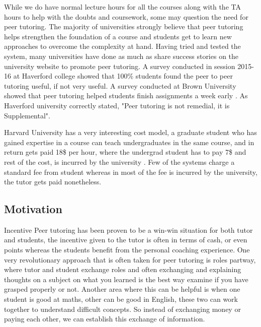\documentclass{sig-alternate-05-2015}
\begin{document}
While we do have normal lecture hours for all the courses along with the TA hours to help with the doubts and coursework, some may question the need for peer tutoring. The majority of universities strongly believe that peer tutoring helps strengthen the foundation of a course and students get to learn new approaches to overcome the complexity at hand. Having tried and tested the system, many universities have done as much as share success stories on the university website to promote peer tutoring. A survey conducted in session 2015-16 at Haverford college showed that 100\% students found the peer to peer tutoring useful, if not very useful. A survey conducted at Brown University showed that peer tutoring helped students finish assignments a week early \cite{Haverford}. As Haverford university correctly stated, "Peer tutoring is not remedial, it is Supplemental".

Harvard University has a very interesting cost model, a graduate student who has gained expertise in a course can teach undergraduates in the same course, and in return gets paid 18\$ per hour, where the undergrad student has to pay 7\$ and rest of the cost, is incurred by the university \cite{Harvard}. Few of the systems charge a standard fee from student whereas in most of the fee is incurred by the university, the tutor gets paid nonetheless. 

\subsection{Motivation}
Incentive Peer tutoring has been proven to be a win-win situation for both tutor and students, the incentive given to the tutor is often in terms of cash, or even points whereas the students benefit from the personal coaching experience. One very revolutionary approach that is often taken for peer tutoring is roles partway, where tutor and student exchange roles and often exchanging and explaining thoughts on a subject on what you learned is the best way examine if you have grasped properly or not. Another area where this can be helpful is when one student is good at maths, other can be good in English, these two can work together to understand difficult concepts. So instead of exchanging money or paying each other, we can establish this exchange of information. 
\end{document}
